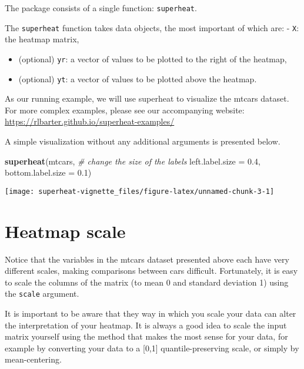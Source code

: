\documentclass[]{book}
\newenvironment{Shaded}{\begin{snugshade}}{\end{snugshade}}
\newcommand{\KeywordTok}[1]{\textcolor[rgb]{0.13,0.29,0.53}{\textbf{{#1}}}}
\newcommand{\DataTypeTok}[1]{\textcolor[rgb]{0.13,0.29,0.53}{{#1}}}
\newcommand{\FloatTok}[1]{\textcolor[rgb]{0.00,0.00,0.81}{{#1}}}
\newcommand{\CommentTok}[1]{\textcolor[rgb]{0.56,0.35,0.01}{\textit{{#1}}}}
\newcommand{\NormalTok}[1]{{#1}}
\theoremstyle{definition}
\theoremstyle{definition}
\theoremstyle{remark}
\begin{document}
The package consists of a single function: \texttt{superheat}.

The \texttt{superheat} function takes data objects, the most important
of which are: - \texttt{X}: the heatmap matrix,

\begin{itemize}
\item
  (optional) \texttt{yr}: a vector of values to be plotted to the right
  of the heatmap,
\item
  (optional) \texttt{yt}: a vector of values to be plotted above the
  heatmap.
\end{itemize}

As our running example, we will use superheat to visualize the mtcars
dataset. For more complex examples, please see our accompanying website:
\url{https://rlbarter.github.io/superheat-examples/}

A simple visualization without any additional arguments is presented
below.

\begin{Shaded}
\begin{Highlighting}[]
\KeywordTok{superheat}\NormalTok{(mtcars,}
          \CommentTok{# change the size of the labels}
          \DataTypeTok{left.label.size =} \FloatTok{0.4}\NormalTok{,}
          \DataTypeTok{bottom.label.size =} \FloatTok{0.1}\NormalTok{)}
\end{Highlighting}
\end{Shaded}

\begin{center}\texttt{[image: superheat-vignette\_files/figure-latex/unnamed-chunk-3-1]} \end{center}

\section{Heatmap scale}\label{heatmap-scale}

Notice that the variables in the mtcars dataset presented above each
have very different scales, making comparisons between cars difficult.
Fortunately, it is easy to scale the columns of the matrix (to mean 0
and standard deviation 1) using the \texttt{scale} argument.

It is important to be aware that they way in which you scale your data
can alter the interpretation of your heatmap. It is always a good idea
to scale the input matrix yourself using the method that makes the most
sense for your data, for example by converting your data to a {[}0,1{]}
quantile-preserving scale, or simply by mean-centering.
\end{document}

